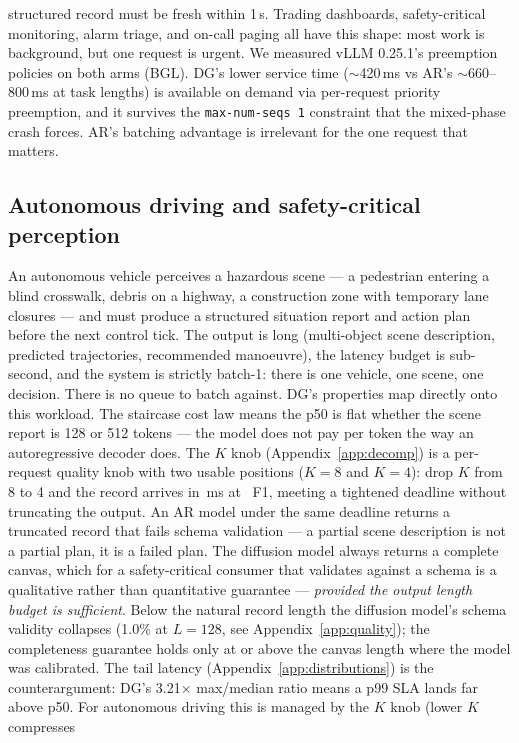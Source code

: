 structured record must be fresh within 1\,s. Trading dashboards,
safety-critical monitoring, alarm triage, and on-call paging all have this
shape: most work is background, but one request is urgent. We measured vLLM 0.25.1's preemption policies on both arms
(BGL). DG's lower service time
($\sim$420\,ms vs AR's $\sim$660--800\,ms at task lengths) is available on
demand via per-request priority preemption, and it survives the
\texttt{max-num-seqs 1} constraint that the mixed-phase crash forces.
AR's batching advantage is irrelevant for the one request that matters. \subsection{Autonomous driving and safety-critical perception} An autonomous vehicle perceives a hazardous scene --- a pedestrian entering
a blind crosswalk, debris on a highway, a construction zone with temporary
lane closures --- and must produce a structured situation report and action
plan before the next control tick. The output is long (multi-object scene
description, predicted trajectories, recommended manoeuvre), the latency
budget is sub-second, and the system is strictly batch-1: there is one
vehicle, one scene, one decision. There is no queue to batch against. DG's properties map directly onto this workload. The staircase cost law
means the p50 is flat whether the scene report is 128 or 512 tokens ---
the model does not pay per token the way an autoregressive decoder does.
The $K$ knob (Appendix~\ref{app:decomp}) is a per-request quality knob with two usable positions ($K{=}8$ and $K{=}4$):
drop $K$ from 8 to 4 and the record arrives in \kFourPfifty\,ms at
\kFourFone\ F1, meeting a tightened deadline without truncating the output.
An AR model under the same deadline returns a truncated record that fails
schema validation --- a partial scene description is not a partial plan, it
is a failed plan. The diffusion model always returns a complete canvas,
which for a safety-critical consumer that validates against a schema is a
qualitative rather than quantitative guarantee --- \emph{provided the output
length budget is sufficient}. Below the natural record length the diffusion
model's schema validity collapses (1.0\% at $L{=}128$, see
Appendix~\ref{app:quality}); the completeness guarantee holds only at or
above the canvas length where the model was calibrated. The tail latency (Appendix~\ref{app:distributions}) is the counterargument:
DG's 3.21$\times$ max/median ratio means a p99 SLA lands far above p50. For
autonomous driving this is managed by the $K$ knob (lower $K$ compresses
